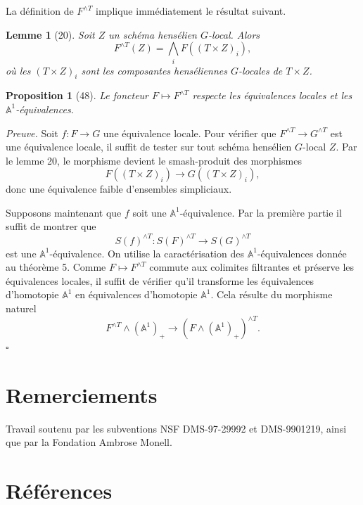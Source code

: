 \documentclass[11pt]{article}
\newcommand{\Aone}{\mathbb A^1}
\theoremstyle{deligne}
\newtheorem*{proposition*}{Proposition}
\newtheorem*{lemma*}{Lemme}
\newenvironment{proofdel}{\noindent\textit{Preuve.}}{\hfill$\square$}
\begin{document}
La définition de \(F^{\wedge T}\) implique immédiatement le résultat suivant.

\begin{lemma*}[20]
Soit \(Z\) un schéma hensélien \(G\)-local. Alors
\[
F^{\wedge T}(Z)=\bigwedge_i F((T\times Z)_i),
\]
où les \((T\times Z)_i\) sont les composantes henséliennes \(G\)-locales de \(T\times Z\).
\end{lemma*}

\begin{proposition*}[48]
Le foncteur \(F\mapsto F^{\wedge T}\) respecte les équivalences locales et les \(\Aone\)-équivalences.
\end{proposition*}

\begin{proofdel}
Soit \(f:F\to G\) une équivalence locale. Pour vérifier que \(F^{\wedge T}\to G^{\wedge T}\) est une équivalence locale, il suffit de tester sur tout schéma hensélien \(G\)-local \(Z\). Par le lemme 20, le morphisme devient le smash-produit des morphismes
\[
F((T\times Z)_i)\longrightarrow G((T\times Z)_i),
\]
donc une équivalence faible d'ensembles simpliciaux.

Supposons maintenant que \(f\) soit une \(\Aone\)-équivalence. Par la première partie il suffit de montrer que
\[
S(f)^{\wedge T}:S(F)^{\wedge T}\longrightarrow S(G)^{\wedge T}
\]
est une \(\Aone\)-équivalence. On utilise la caractérisation des \(\Aone\)-équivalences donnée au théorème 5. Comme \(F\mapsto F^{\wedge T}\) commute aux colimites filtrantes et préserve les équivalences locales, il suffit de vérifier qu'il transforme les équivalences d'homotopie \(\Aone\) en équivalences d'homotopie \(\Aone\). Cela résulte du morphisme naturel
\[
F^{\wedge T}\wedge(\Aone)_+\longrightarrow (F\wedge(\Aone)_+)^{\wedge T}.
\]
\end{proofdel}

\section*{Remerciements}

Travail soutenu par les subventions NSF DMS-97-29992 et DMS-9901219, ainsi que par la Fondation Ambrose Monell.

\section*{Références}
\end{document}
